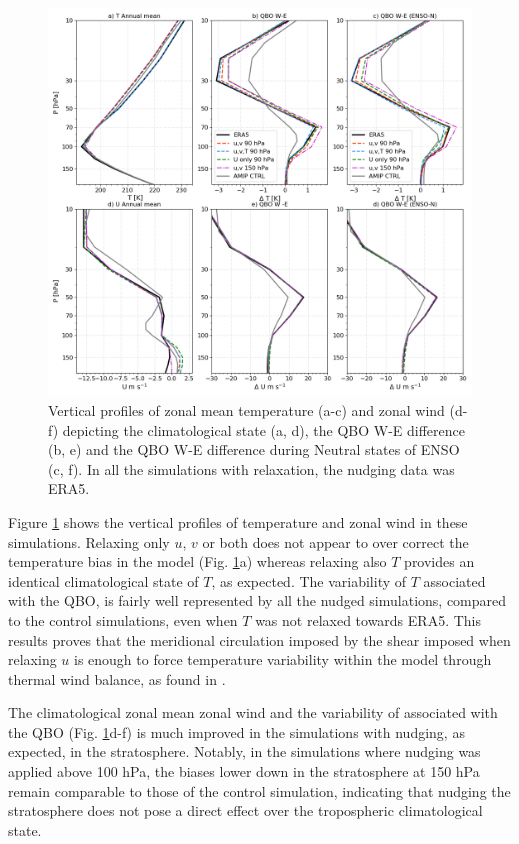 \begin{figure}[t!]
\centering
 \includegraphics[width=\linewidth]{figures/profilUTclimatology.png}
\caption[Nudging sensitivity QBO profiles]{Vertical profiles of zonal mean temperature (a-c) and zonal wind (d-f) depicting the climatological state (a, d), the QBO W-E difference (b, e) and the QBO W-E difference during Neutral states of ENSO (c, f). In all the simulations with relaxation, the nudging data was ERA5.}
\label{fig:prof_nudg}
\end{figure}

Figure \ref{fig:prof_nudg} shows the vertical profiles of temperature and zonal wind in these simulations. Relaxing only $u$, $v$ or both does not appear to over correct the temperature bias in the model (Fig. \ref{fig:prof_nudg}a) whereas relaxing also $T$ provides an identical climatological state of $T$, as expected. The variability of $T$ associated with the QBO, is fairly well represented by all the nudged simulations, compared to the control simulations, even when $T$ was not relaxed towards ERA5. This results proves that the meridional circulation imposed by the shear imposed when relaxing $u$ is enough to force temperature variability within the model through thermal wind balance, as found in \cite{martin2021}. 

The climatological zonal mean zonal wind and the variability of associated with the QBO (Fig. \ref{fig:prof_nudg}d-f) is much improved in the simulations with nudging, as expected, in the stratosphere. Notably, in the simulations where nudging was applied above 100 hPa, the biases lower down in the stratosphere at 150 hPa remain comparable to those of the control simulation, indicating that nudging the stratosphere does not pose a direct effect over the tropospheric climatological state.

